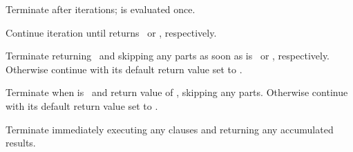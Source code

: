 \begin{LIST}{1cm}
\begin{LIST}{.5cm}
    {
    Terminate  after  iterations;  is evaluated once.
    }

    {
    Continue iteration until  returns \NIL\ or \T, respectively.
    }

    {
    Terminate  returning \NIL\ and skipping any
     parts as soon as  is \NIL\ or \T,
    respectively. Otherwise continue  with its default return
    value set to \T. 
    }

    {
    Terminate  when  is \T\ and return value of
    , skipping any  parts. Otherwise continue
     with its default return value set to \NIL. 
    }

    {
    Terminate  immediately executing any 
    clauses and returning any accumulated results.
    }
  \end{LIST}
\end{LIST}





